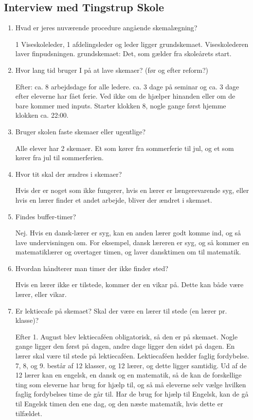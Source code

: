 \subsection{Interview med Tingstrup Skole}
\begin{enumerate}
	\item Hvad er jeres nuværende procedure angående skemalægning?
	
	1 Viseskoleleder, 1 afdelingsleder og leder ligger grundskemaet. Viseskolederen laver finpudsningen.
	grundskemaet: Det, som gælder fra skoleårets start.
	\item Hvor lang tid bruger I på at lave skemaer? (før og efter reform?)
	
	Efter: ca. 8 arbejdsdage for alle ledere. ca. 3 dage på seminar og ca. 3 dage efter eleverne har fået ferie. Ved ikke om de hjælper hinanden eller om de bare kommer med inputs. Starter klokken 8, nogle gange først hjemme klokken ca. 22:00.
	\item Bruger skolen faste skemaer eller ugentlige?
	
	Alle elever har 2 skemaer. Et som kører fra sommerferie til jul, og et som kører fra jul til sommerferien.
	\item Hvor tit skal der ændres i skemaer?
	
	Hvis der er noget som ikke fungerer, hvis en lærer er længerevarende syg, eller hvis en lærer finder et andet arbejde, bliver der ændret i skemaet.
	\item Findes buffer-timer? 
	
	Nej. Hvis en dansk-lærer er syg, kan en anden lærer godt komme ind, og så lave undervisningen om. For eksempel, dansk læreren er syg, og så kommer en matematiklærer og overtager timen, og laver dansktimen om til matematik.
	\item Hvordan håndterer man timer der ikke finder sted?
	
	Hvis en lærer ikke er tilstede, kommer der en vikar på. Dette kan både være lærer, eller vikar.
	\item Er lektiecafe på skemaet? Skal der være en lærer til stede (en lærer pr. klasse)?
	
	Efter 1. August blev lektiecaf\'een obligatorisk, så den er på skemaet. Nogle gange ligger den først på dagen, andre dage ligger den sidst på dagen.
	En lærer skal være til stede på lektiecaféen. Lektiecaféen hedder faglig fordybelse. 7, 8, og 9. består af 12 klasser, og 12 lærer, og dette ligger samtidig. Ud af de 12 lærer kan en engelsk, en dansk og en matematik, så de kan de forskellige ting som eleverne har brug for hjælp til, og så må eleverne selv vælge hvilken faglig fordybelses time de går til. Har de brug for hjælp til Engelsk, kan de gå til Engelsk timen den ene dag, og den næste matematik, hvis dette er tilfældet.
	

\end{enumerate}
